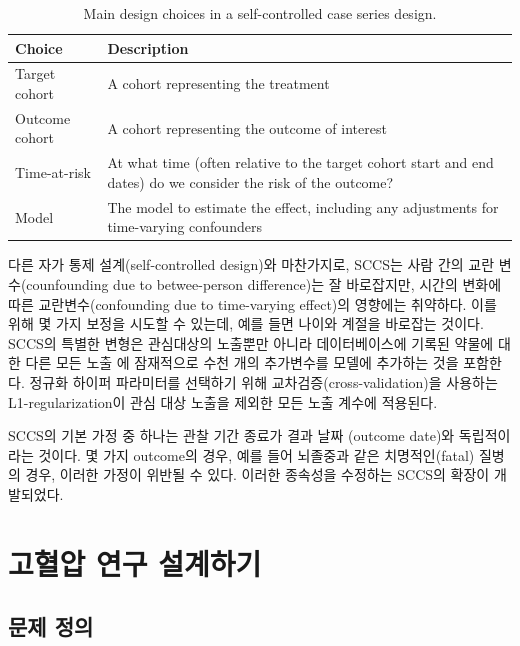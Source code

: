 \documentclass[11pt]{book}
\theoremstyle{definition}
\theoremstyle{definition}
\theoremstyle{definition}
\theoremstyle{remark}
\begin{document}
\begin{table}[t]

\caption{\label{tab:sccsChoices}Main design choices in a self-controlled case series design.}
\centering
\begin{tabu} to 
\toprule
Choice & Description\\
\midrule
Target cohort & A cohort representing the treatment\\
Outcome cohort & A cohort representing the outcome of interest\\
Time-at-risk & At what time (often relative to the target cohort start and end dates) do we consider the risk of the outcome?\\
Model & The model to estimate the effect, including any adjustments for time-varying confounders\\
\bottomrule
\end{tabu}
\end{table}

다른 자가 통제 설계(self-controlled design)와 마찬가지로, SCCS는 사람
간의 교란 변수(counfounding due to betwee-person difference)는 잘
바로잡지만, 시간의 변화에 따른 교란변수(confounding due to time-varying
effect)의 영향에는 취약하다. 이를 위해 몇 가지 보정을 시도할 수 있는데,
예를 들면 나이와 계절을 바로잡는 것이다. SCCS의 특별한 변형은 관심대상의
노출뿐만 아니라 데이터베이스에 기록된 약물에 대한 다른 모든 노출
\citep{simpson_2013} 에 잠재적으로 수천 개의 추가변수를 모델에 추가하는
것을 포함한다. 정규화 하이퍼 파라미터를 선택하기 위해
교차검증(cross-validation)을 사용하는 L1-regularization이 관심 대상
노출을 제외한 모든 노출 계수에 적용된다.

SCCS의 기본 가정 중 하나는 관찰 기간 종료가 결과 날짜 (outcome date)와
독립적이라는 것이다. 몇 가지 outcome의 경우, 예를 들어 뇌졸중과 같은
치명적인(fatal) 질병의 경우, 이러한 가정이 위반될 수 있다. 이러한
종속성을 수정하는 SCCS의 확장이 개발되었다. \citep{farrington_2011}

\section{고혈압 연구 설계하기}\label{--}

\subsection{문제 정의}\label{--1}
\end{document}
